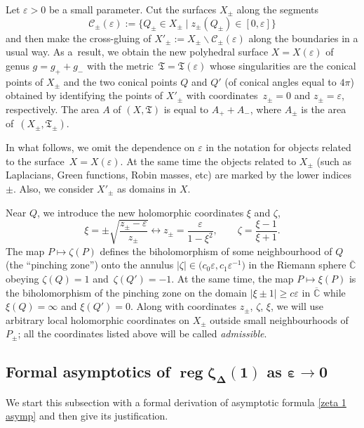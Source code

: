 \documentclass[pdftex]{sigma}
\numberwithin{equation}{section}
\theoremstyle{definition}
\begin{document}
Let $\varepsilon>0$ be a small parameter. Cut the surfaces $X_\pm$ along the segments
\[\mathscr{C}_\pm(\varepsilon):=\{Q_\pm\in X_\pm \mid z_\pm(Q_\pm)\in [0,\varepsilon]\}\]
and then make the cross-gluing of $X'_\pm:=X_\pm\backslash\mathscr{C}_\pm(\varepsilon)$ along the boundaries in a usual way. As a~result, we obtain the new polyhedral surface $X=X(\varepsilon)$ of genus $g=g_++g_-$ with the metric~${\mathfrak{T}=\mathfrak{T}(\varepsilon)}$ whose singularities are the conical points of $X_\pm$ and the two conical points $Q$ and $Q'$ (of conical angles equal to $4\pi$) obtained by identifying the points of $X'_\pm$ with coordinates~${z_\pm=0}$ and $z_\pm=\varepsilon$, respectively. The area $A$ of $(X,\mathfrak{T})$ is equal to $A_++A_-$, where $A_{\pm}$ is the area of~${(X_\pm,\mathfrak{T}_\pm)}$.

In what follows, we omit the dependence on $\varepsilon$ in the notation for objects related to the surface~${X=X(\varepsilon)}$. At the same time the objects related to $X_\pm$ (such as Laplacians, Green functions, Robin masses, etc) are marked by the lower indices $\pm$. Also, we consider $X'_\pm$ as domains in $X$.

Near $Q$, we introduce the new holomorphic coordinates $\xi$ and $\zeta$,
\begin{equation}
\label{coordinates near pinch}
\xi=\pm\sqrt{\frac{z_\pm-\varepsilon}{z_\pm}} \longleftrightarrow z_\pm=\frac{\varepsilon}{1-\xi^2}, \qquad \zeta=\frac{\xi-1}{\xi+1}.
\end{equation}
The map $P\mapsto \zeta(P)$ defines the biholomorphism of some neighbourhood of $Q$ (the ``pinching zone'') onto the annulus $|\zeta|\in \bigl(c_0\varepsilon,c_1\varepsilon^{-1}\bigr)$ in the Riemann sphere $\overline{\mathbb{C}}$ obeying $\zeta(Q)=1$ and~${\zeta(Q')=-1}$. At the same time, the map $P\mapsto \xi(P)$ is the biholomorphism of the pinching zone on the domain $|\xi\pm 1|\ge c\varepsilon$ in $\overline{\mathbb{C}}$ while $\xi(Q)=\infty$ and $\xi(Q')=0$. Along with coordinates $z_\pm$, $\zeta$, $\xi$, we will use arbitrary local holomorphic coordinates on $X_\pm$ outside small neighbourhoods of $P_\pm$; all the coordinates listed above will be called {\it admissible}.

\subsection*{Formal asymptotics of $\boldsymbol{\operatorname{reg}\zeta_\Delta(1)}$ as $\boldsymbol{\varepsilon\to 0}$}
 We start this subsection with a formal derivation of asymptotic formula \eqref{zeta 1 asymp} and then give its justification.
\end{document}
